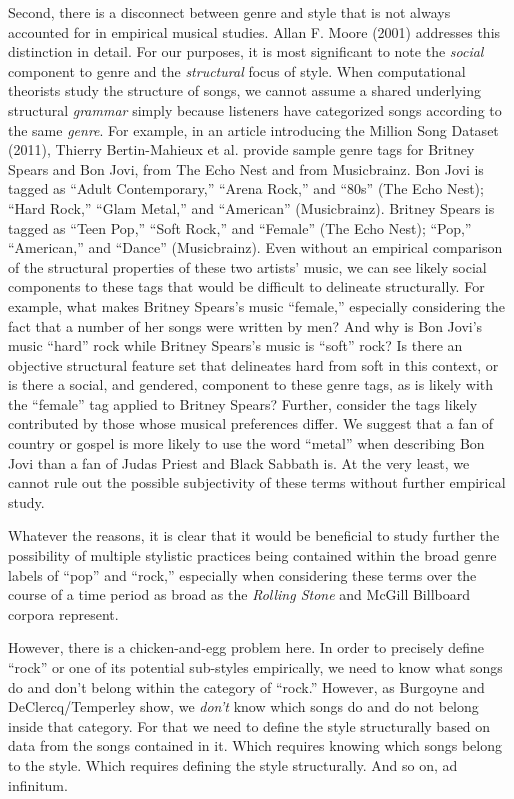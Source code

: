 Second, there is a disconnect between genre and style that is not always accounted for in empirical musical studies. Allan F. Moore (2001) addresses this distinction in detail. For our purposes, it is most significant to note the \emph{social} component to genre and the \emph{structural} focus of style. When computational theorists study the structure of songs, we cannot assume a shared underlying structural \emph{grammar} simply because listeners have categorized songs according to the same \emph{genre}. For example, in an article introducing the Million Song Dataset (2011), Thierry Bertin-Mahieux et al. provide sample genre tags for Britney Spears and Bon Jovi, from The Echo Nest and from Musicbrainz. Bon Jovi is tagged as ``Adult Contemporary,'' ``Arena Rock,'' and ``80s'' (The Echo Nest); ``Hard Rock,'' ``Glam Metal,'' and ``American'' (Musicbrainz). Britney Spears is tagged as ``Teen Pop,'' ``Soft Rock,'' and ``Female'' (The Echo Nest); ``Pop,'' ``American,'' and ``Dance'' (Musicbrainz). Even without an empirical comparison of the structural properties of these two artists' music, we can see likely social components to these tags that would be difficult to delineate structurally. For example, what makes Britney Spears's music ``female,'' especially considering the fact that a number of her songs were written by men? And why is Bon Jovi's music ``hard'' rock while Britney Spears's music is ``soft'' rock? Is there an objective structural feature set that delineates hard from soft in this context, or is there a social, and gendered, component to these genre tags, as is likely with the ``female'' tag applied to Britney Spears? Further, consider the tags likely contributed by those whose musical preferences differ. We suggest that a fan of country or gospel is more likely to use the word ``metal'' when describing Bon Jovi than a fan of Judas Priest and Black Sabbath is. At the very least, we cannot rule out the possible subjectivity of these terms without further empirical study.

Whatever the reasons, it is clear that it would be beneficial to study further the possibility of multiple stylistic practices being contained within the broad genre labels of ``pop'' and ``rock,'' especially when considering these terms over the course of a time period as broad as the \emph{Rolling Stone} and McGill Billboard corpora represent.

However, there is a chicken-and-egg problem here. In order to precisely define ``rock'' or one of its potential sub-styles empirically, we need to know what songs do and don't belong within the category of ``rock.'' However, as Burgoyne and DeClercq\slash Temperley show, we \emph{don't} know which songs do and do not belong inside that category. For that we need to define the style structurally based on data from the songs contained in it. Which requires knowing which songs belong to the style. Which requires defining the style structurally. And so on, ad infinitum.

